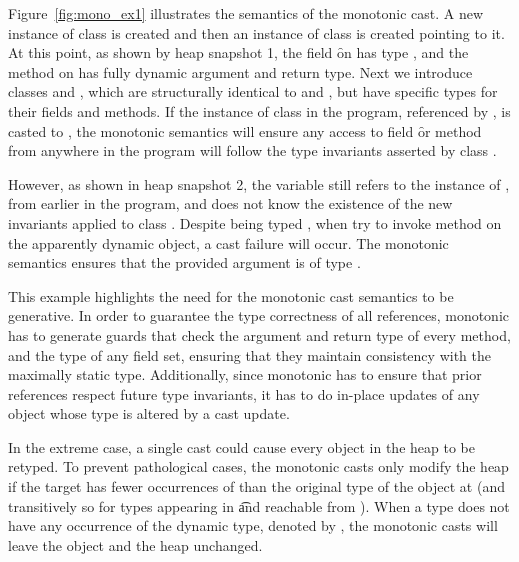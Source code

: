 \documentclass[a4paper,USenglish]{tex/lipics-v2016}
\begin{document}
Figure~\ref{fig:mono_ex1} illustrates the semantics of the monotonic cast. 
A new instance of class \D is created and then an instance of class \C 
is created pointing to it. At this point, as shown by heap snapshot 1, 
the field \f on \C has type \any, and the method \m on \D has fully dynamic 
argument and return type. Next we introduce classes \E and , which are structurally 
identical to \C and \D, but have specific types for their fields and methods. 
If the instance of class \C in the program, referenced by \a, is casted to \E, 
the monotonic semantics will ensure any access to field \f or method \m from 
anywhere in the program will follow the type invariants asserted by class \E.

However, as shown in heap snapshot 2, the variable  still refers to 
the instance of \D, from earlier in the program, and 
does not know the existence of the new invariants applied to class \D. Despite being
typed \any, when  try to invoke method \m on the apparently dynamic 
object, a cast failure will occur. The monotonic semantics ensures that the
provided argument is of type \E. 

This example highlights the need for the monotonic cast semantics to be generative.
In order to guarantee the type correctness of all references, monotonic has to generate guards
that check the argument and return type of every method, and the
type of any field set, ensuring that they maintain consistency with the 
maximally static type. Additionally, since monotonic has to ensure that 
prior references respect future type invariants, it has to do in-place updates
of any object whose type is altered by a cast update.

In the extreme case, a single cast could cause every object in the heap to be
retyped. To prevent pathological cases, the monotonic casts only modify the heap
if the target \C has fewer occurrences of \any than the original type of the
object at \a (and transitively so for types appearing in \t and reachable
from \a).  When a type \C does not have any occurrence of the dynamic type,
denoted by \statictype\C\K\V, the monotonic casts will leave the object and the
heap unchanged.
\end{document}
